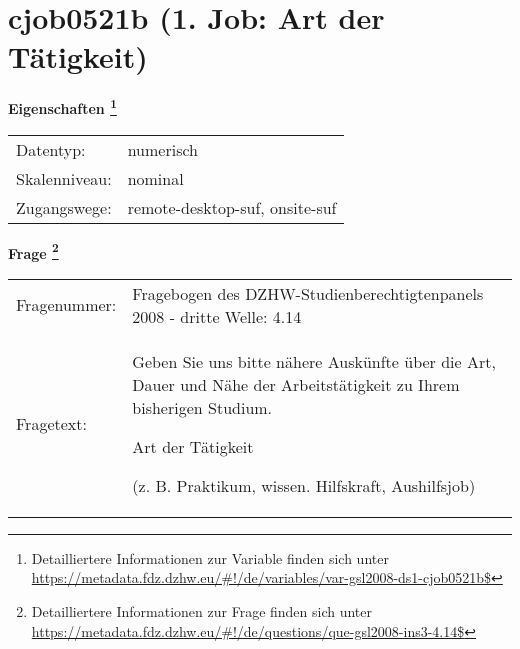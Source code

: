 
    \setcounter{footnote}{0}

    \vspace*{-1.8cm}
	\section{cjob0521b (1. Job: Art der Tätigkeit)}
	\label{section:cjob0521b}



    \vspace*{0.5cm}
    \noindent\textbf{Eigenschaften
	\footnote{Detailliertere Informationen zur Variable finden sich unter
		\url{https://metadata.fdz.dzhw.eu/\#!/de/variables/var-gsl2008-ds1-cjob0521b$}}}\\
	\begin{tabularx}{\hsize}{@{}lX}
	Datentyp: & numerisch \\
	Skalenniveau: & nominal \\
	Zugangswege: &
	  remote-desktop-suf, 
	  onsite-suf
 \\
    \end{tabularx}



				\vspace*{0.5cm}
                \noindent\textbf{Frage
	                \footnote{Detailliertere Informationen zur Frage finden sich unter
		              \url{https://metadata.fdz.dzhw.eu/\#!/de/questions/que-gsl2008-ins3-4.14$}}}\\
				\begin{tabularx}{\hsize}{@{}lX}
					Fragenummer: &
					  Fragebogen des DZHW-Studienberechtigtenpanels 2008 - dritte Welle:
					  4.14
 \\
					Fragetext: & Geben Sie uns bitte nähere Auskünfte über die Art, Dauer und Nähe der Arbeitstätigkeit zu Ihrem bisherigen Studium.\par  Art der Tätigkeit\par  (z. B. Praktikum, wissen. Hilfskraft, Aushilfsjob) \\
				\end{tabularx}





